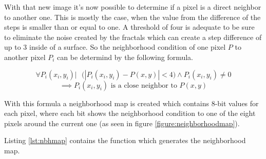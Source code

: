 With that new image it's now possible to determine if a pixel is a direct neighbor to another one. This is mostly the case,
when the value from the difference of the steps is smaller than or equal to one. A threshold of four is adequate to be sure 
to eliminate the noise created by the fractals which can create a step difference of up to 3 inside of a surface. 
So the neighborhood condition of one pixel $P$ to another pixel $P_i$ can be determind by the following formula.

\[
 \forall P_i(x_i,y_i)  |\mbox{   }
 \Big(\left|P_i(x_i,y_i)-P(x,y)\right|<4 \Big) \wedge  P_i(x_i,y_i) \neq 0 %
\]
\[
 \implies P_i(x_i,y_i) \mbox{ is a close neighbor to } P(x,y)
\]

With this formula a neighborhood map is created which contains 8-bit values for each pixel, where each bit shows the neighborhood 
condition to one of the eight pixels around the current one (as seen in figure \vref{figure:neighborhoodmap}).

Listing \vref{lst:nbhmap} contains the function which generates the neighborhood map.

